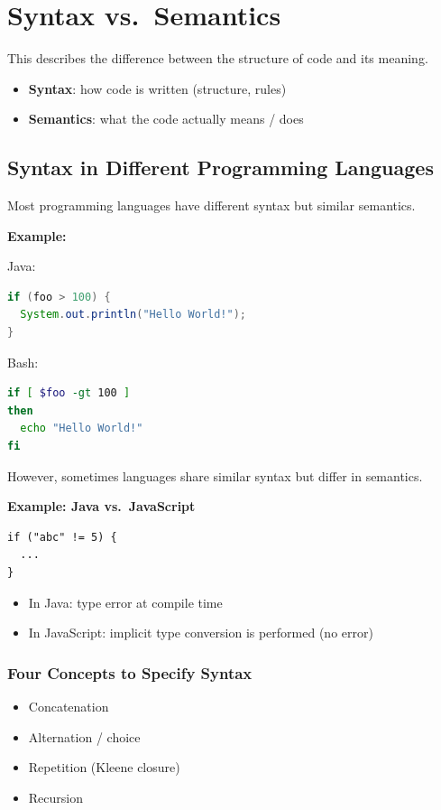 \documentclass{article}
\begin{document}
\section{Syntax vs.\ Semantics}
This describes the difference between the structure of code and its meaning.

\begin{itemize}
  \item \textbf{Syntax}: how code is written (structure, rules)
  \item \textbf{Semantics}: what the code actually means / does
\end{itemize}

\subsection{Syntax in Different Programming Languages}
Most programming languages have different syntax but similar semantics.

\textbf{Example:}

Java:
\begin{lstlisting}[language=Java]
if (foo > 100) {
  System.out.println("Hello World!");
}
\end{lstlisting}

Bash:
\begin{lstlisting}[language=Bash]
if [ $foo -gt 100 ]
then
  echo "Hello World!"
fi
\end{lstlisting}

\medskip
However, sometimes languages share similar syntax but differ in semantics.

\textbf{Example: Java vs.\ JavaScript}
\begin{lstlisting}
if ("abc" != 5) {
  ...
}
\end{lstlisting}

\begin{itemize}
  \item In Java: type error at compile time
  \item In JavaScript: implicit type conversion is performed (no error)
\end{itemize}

\subsubsection{Four Concepts to Specify Syntax}
\begin{itemize}
  \item Concatenation
  \item Alternation / choice
  \item Repetition (Kleene closure)
  \item Recursion
\end{itemize}
\end{document}
